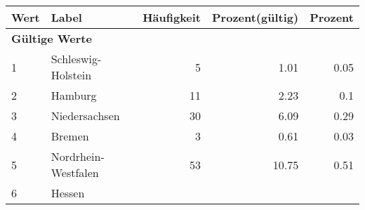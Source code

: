      \begin{longtable}{lXrrr}
     \toprule
     \textbf{Wert} & \textbf{Label} & \textbf{Häufigkeit} & \textbf{Prozent(gültig)} & \textbf{Prozent} \\
     \endhead
     \midrule
     \multicolumn{5}{l}{\textbf{Gültige Werte}}\\

     1 &
     \multicolumn{1}{X}{ Schleswig-Holstein   } &


       \num{5} &
       \num[round-mode=places,round-precision=2]{1,01} &
         \num[round-mode=places,round-precision=2]{0,05} \\

     2 &
     \multicolumn{1}{X}{ Hamburg   } &


       \num{11} &
       \num[round-mode=places,round-precision=2]{2,23} &
         \num[round-mode=places,round-precision=2]{0,1} \\

     3 &
     \multicolumn{1}{X}{ Niedersachsen   } &


       \num{30} &
       \num[round-mode=places,round-precision=2]{6,09} &
         \num[round-mode=places,round-precision=2]{0,29} \\

     4 &
     \multicolumn{1}{X}{ Bremen   } &


       \num{3} &
       \num[round-mode=places,round-precision=2]{0,61} &
         \num[round-mode=places,round-precision=2]{0,03} \\

     5 &
     \multicolumn{1}{X}{ Nordrhein-Westfalen   } &


       \num{53} &
       \num[round-mode=places,round-precision=2]{10,75} &
         \num[round-mode=places,round-precision=2]{0,51} \\

     6 &
     \multicolumn{1}{X}{ Hessen   } &



\end{longtable}
